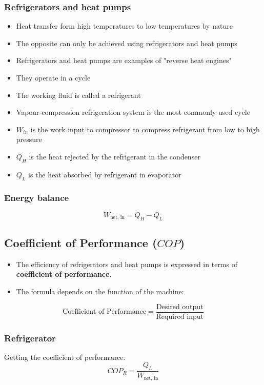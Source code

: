 \documentclass[11pt]{article}
\begin{document}
\subsubsection{Refrigerators and heat pumps}
\label{sec:org4c75903}
\begin{itemize}
\item Heat transfer form high temperatures to low temperatures by nature
\item The opposite can only be achieved using refrigerators and heat pumps
\item Refrigerators and heat pumps are examples of "reverse heat engines"
\item They operate in a cycle
\item The working fluid is called a refrigerant
\item Vapour-compression refrigeration system is the most commonly used cycle
\item \(W_{in}\) is the work input to compressor to compress refrigerant from low to high pressure
\item \(Q_H\) is the heat rejected by the refrigerant in the condenser
\item \(Q_L\) is the heat absorbed by refrigerant in evaporator
\end{itemize}

\subsubsection{Energy balance}
\label{sec:orgbcefcf1}
\[W_{\text{net, in}} = Q_H - Q_L\]

\subsection{Coefficient of Performance (\(COP\))}
\label{sec:org497227b}
\begin{itemize}
\item The efficiency of refrigerators and heat pumps is expressed in terms of \textbf{coefficient of performance}.
\item The formula depends on the function of the machine:
\end{itemize}
\[\text{Coefficient of Performance} = \frac{\text{Desired output}}{\text{Required input}}\]

 \newpage

\subsubsection{Refrigerator}
\label{sec:org13ffe87}
Getting the coefficient of performance:
\[COP_R = \frac{Q_L}{W_{\text{net, in}}}\]
\end{document}
